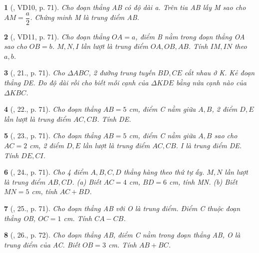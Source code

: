 \documentclass{article}
\newtheorem{baitoan}{}
\begin{document}
\begin{baitoan}[\cite{Binh_Toan_6_tap_2}, VD10, p. 71]
	Cho đoạn thẳng AB có độ dài a. Trên tia AB lấy M sao cho $AM = \dfrac{a}{2}$. Chứng minh M là trung điểm AB.
\end{baitoan}

\begin{baitoan}[\cite{Binh_Toan_6_tap_2}, VD11, p. 71]
	Cho đoạn thẳng $OA = a$, điểm B nằm trong đoạn thẳng OA sao cho $OB = b$. $M,N,I$ lần lượt là trung điểm $OA,OB,AB$. Tính  $IM,IN$ theo $a,b$.
\end{baitoan}

\begin{baitoan}[\cite{Binh_Toan_6_tap_2}, 21., p. 71]
	Cho $\Delta ABC$, 2 đường trung tuyến $BD,CE$ cắt nhau ở K. Kẻ đoạn thẳng DE. Đo độ dài rồi cho biết mỗi cạnh của $\Delta KDE$ bằng nửa cạnh nào của $\Delta KBC$.
\end{baitoan}

\begin{baitoan}[\cite{Binh_Toan_6_tap_2}, 22., p. 71]
	Cho đoạn thẳng $AB = 5$ {\rm cm}, điểm C nằm giữa $A,B$, 2 điểm $D,E$ lần lượt là trung điểm $AC,CB$. Tính  DE.
\end{baitoan}

\begin{baitoan}[\cite{Binh_Toan_6_tap_2}, 23., p. 71]
	Cho đoạn thẳng $AB = 5$ {\rm cm}, điểm C nằm giữa $A,B$ sao cho $AC = 2$ {\rm cm}, 2 điểm $D,E$ lần lượt là trung điểm $AC,CB$. I là trung điểm DE. Tính  $DE,CI$.
\end{baitoan}

\begin{baitoan}[\cite{Binh_Toan_6_tap_2}, 24., p. 71]
	Cho 4 điểm $A,B,C,D$ thẳng hàng theo thứ tự ấy. $M,N$ lần lượt là trung điểm $AB,CD$. (a) Biết $AC = 4$ {\rm cm}, $BD = 6$ {\rm cm}, tính MN. (b) Biết $MN = 5$ {\rm cm}, tính $AC + BD$.
\end{baitoan}

\begin{baitoan}[\cite{Binh_Toan_6_tap_2}, 25., p. 71]
	Cho đoạn thẳng AB với O là trung điểm. Điểm C thuộc đoạn thẳng OB, $OC = 1$ {\rm cm}. Tính $CA - CB$.
\end{baitoan}

\begin{baitoan}[\cite{Binh_Toan_6_tap_2}, 26., p. 72]
	Cho đoạn thẳng AB, điểm C nằm trong đoạn thẳng AB, O là trung điểm của AC. Biết $OB = 3$ {\rm cm}. Tính $AB + BC$.
\end{baitoan}
\end{document}
